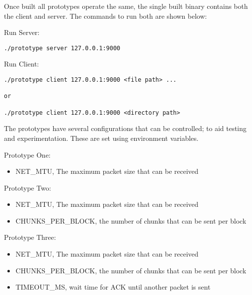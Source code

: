 Once built all prototypes operate the same, the single built binary contains both the client and server. The commands to run both are shown below:

Run Server:

\begin{lstlisting}
./prototype server 127.0.0.1:9000
\end{lstlisting}

Run Client:

\begin{lstlisting}
./prototype client 127.0.0.1:9000 <file path> ...

or

./prototype client 127.0.0.1:9000 <directory path>
\end{lstlisting}

The prototypes have several configurations that can be controlled; to aid testing and experimentation. These are set using environment variables.

Prototype One:

\begin{itemize}
    \item NET\_MTU, The maximum packet size that can be received
\end{itemize}

Prototype Two:

\begin{itemize}
    \item NET\_MTU, The maximum packet size that can be received
    \item CHUNKS\_PER\_BLOCK, the number of chunks that can be sent per block
\end{itemize}

Prototype Three:

\begin{itemize}
    \item NET\_MTU, The maximum packet size that can be received
    \item CHUNKS\_PER\_BLOCK, the number of chunks that can be sent per block
    \item TIMEOUT\_MS, wait time for ACK until another packet is sent
\end{itemize}
